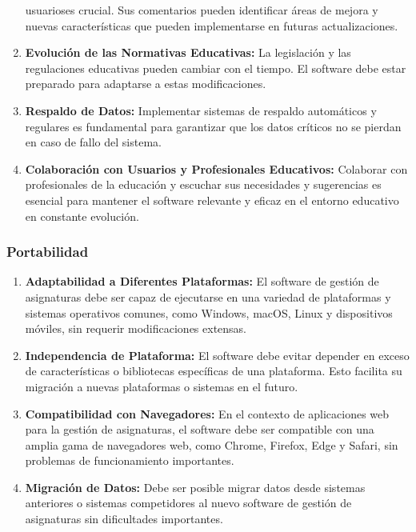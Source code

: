 \documentclass[11pt]{article}
\begin{document}
\begin{enumerate}
usuarioses crucial. Sus comentarios pueden identificar áreas de 
mejora y nuevas características que pueden implementarse en futuras
actualizaciones.
\item \textbf{Evolución de las Normativas Educativas:} La legislación y las
regulaciones educativas pueden cambiar con el tiempo. El software
debe estar preparado para adaptarse a estas modificaciones.
\item \textbf{Respaldo de Datos:} Implementar sistemas de respaldo 
automáticos y regulares es fundamental para garantizar que los datos
críticos no se pierdan en caso de fallo del sistema.
\item \textbf{Colaboración con Usuarios y Profesionales Educativos: }
Colaborar con profesionales de la educación y escuchar sus 
necesidades y sugerencias es esencial para mantener el software 
relevante y eficaz en el entorno educativo en constante evolución.

\end{enumerate}

\subsubsection{Portabilidad}


\begin{enumerate}
\item \textbf{Adaptabilidad a Diferentes Plataformas:} El software 
de gestión de asignaturas debe ser capaz de ejecutarse en una 
variedad de plataformas y sistemas operativos comunes, como Windows,
macOS, Linux y dispositivos móviles, sin requerir modificaciones 
extensas.
\item \textbf{Independencia de Plataforma:} El software debe evitar
depender en exceso de características o bibliotecas específicas de 
una plataforma. Esto facilita su migración a nuevas plataformas o
sistemas en el futuro. 
\item \textbf{Compatibilidad con Navegadores:} En el contexto de 
aplicaciones web para la gestión de asignaturas, el software debe 
ser compatible con una amplia gama de navegadores web, como Chrome,
Firefox, Edge y Safari, sin problemas de funcionamiento importantes.
\item \textbf{Migración de Datos:} Debe ser posible migrar datos 
desde sistemas anteriores o sistemas competidores al nuevo software 
de gestión de asignaturas sin dificultades importantes.
\end{enumerate}
\end{document}
